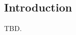\chapter[\cobpzeroshorttitle{}]{\cobpzeroshorttitle{}}

\label{cobp0}

\section{Introduction}
\label{cobp0:sint0}

TBD.


